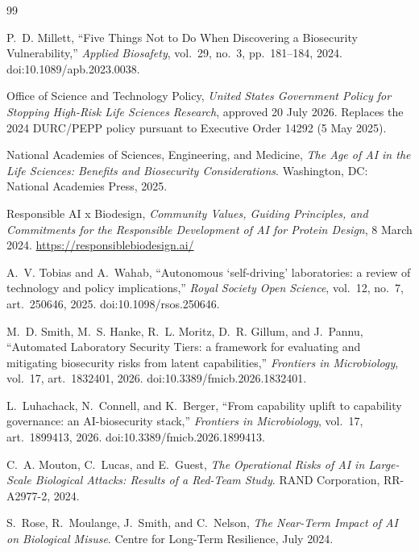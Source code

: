 \documentclass[11pt,letterpaper]{article}
\begin{document}
\renewcommand{\refname}{References}
\begin{thebibliography}{99}

P.~D. Millett, ``Five Things Not to Do When Discovering a Biosecurity Vulnerability,''
\textit{Applied Biosafety}, vol.~29, no.~3, pp.~181--184, 2024. doi:10.1089/apb.2023.0038.

Office of Science and Technology Policy, \textit{United States Government Policy for Stopping High-Risk Life Sciences Research}, approved 20 July 2026. Replaces the 2024 DURC/PEPP policy pursuant to Executive Order 14292 (5 May 2025).

National Academies of Sciences, Engineering, and Medicine, \textit{The Age of AI in the Life Sciences: Benefits and Biosecurity Considerations}. Washington, DC: National Academies Press, 2025.

Responsible AI x Biodesign, \textit{Community Values, Guiding Principles, and Commitments for the Responsible Development of AI for Protein Design}, 8 March 2024. \url{https://responsiblebiodesign.ai/}

A.~V. Tobias and A.~Wahab, ``Autonomous `self-driving' laboratories: a review of technology and policy implications,''
\textit{Royal Society Open Science}, vol.~12, no.~7, art.~250646, 2025. doi:10.1098/rsos.250646.

M.~D. Smith, M.~S. Hanke, R.~L. Moritz, D.~R. Gillum, and J.~Pannu, ``Automated Laboratory Security Tiers: a framework for evaluating and mitigating biosecurity risks from latent capabilities,''
\textit{Frontiers in Microbiology}, vol.~17, art.~1832401, 2026. doi:10.3389/fmicb.2026.1832401.

L.~Luhachack, N.~Connell, and K.~Berger, ``From capability uplift to capability governance: an AI-biosecurity stack,''
\textit{Frontiers in Microbiology}, vol.~17, art.~1899413, 2026. doi:10.3389/fmicb.2026.1899413.

C.~A. Mouton, C.~Lucas, and E.~Guest, \textit{The Operational Risks of AI in Large-Scale Biological Attacks: Results of a Red-Team Study}. RAND Corporation, RR-A2977-2, 2024.

S.~Rose, R.~Moulange, J.~Smith, and C.~Nelson, \textit{The Near-Term Impact of AI on Biological Misuse}. Centre for Long-Term Resilience, July 2024.


\end{thebibliography}
\end{document}
